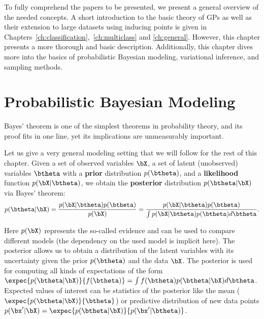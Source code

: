 


\graphicspath{{2_background/figures/}}

To fully comprehend the papers to be presented, we present a general overview of the needed concepts.
A short introduction to the basic theory of \acl{GPs} as well as their extension to large datasets using inducing points \cite{Titsias2009} is given in Chapters~\ref{ch:classification},~\ref{ch:multiclass} and \ref{ch:general}.
However, this chapter presents a more thorough and basic description.
Additionally, this chapter dives more into the basics of probabilistic Bayesian modeling, variational inference, and sampling methods.

\section{Probabilistic Bayesian Modeling}

\label{sec:prob_bayes}

Bayes' theorem is one of the simplest theorems in probability theory, and its proof fits in one line, yet its implications are unmeasurably important.

Let us give a very general modeling setting that we will follow for the rest of this chapter.
Given a set of observed variables $\bX$, a set of latent (unobserved) variables $\btheta$ with a \textbf{prior} distribution $p(\btheta)$, and a \textbf{likelihood} function $p(\bX|\btheta)$, we obtain the \textbf{posterior} distribution $p(\btheta|\bX)$ via Bayes' theorem:
\begin{align}
p(\btheta|\bX) = \frac{p(\bX|\btheta)p(\btheta)}{p(\bX)} = \frac{p(\bX|\btheta)p(\btheta)}{\int p(\bX|\btheta)p(\btheta)d\btheta}.
\label{eq:bayes}
\end{align}

Here $p(\bX)$ represents the so-called evidence and can be used to compare different models (the dependency on the used model is implicit here).
The posterior allows us to obtain a distribution of the latent variables with its uncertainty given the prior $p(\btheta)$ and the data $\bX$.
The posterior is used for computing all kinds of expectations of the form $\expec{p(\btheta|\bX)}{f(\btheta)} = \int f(\btheta)p(\btheta|\bX)d\btheta$.
Expected values of interest can be statistics of the posterior like the mean ($\expec{p(\btheta|\bX)}{\btheta}$) or predictive distribution of new data points $p(\bx'|\bX) = \expec{p(\btheta|\bX)}{p(\bx'|\btheta)}$.


